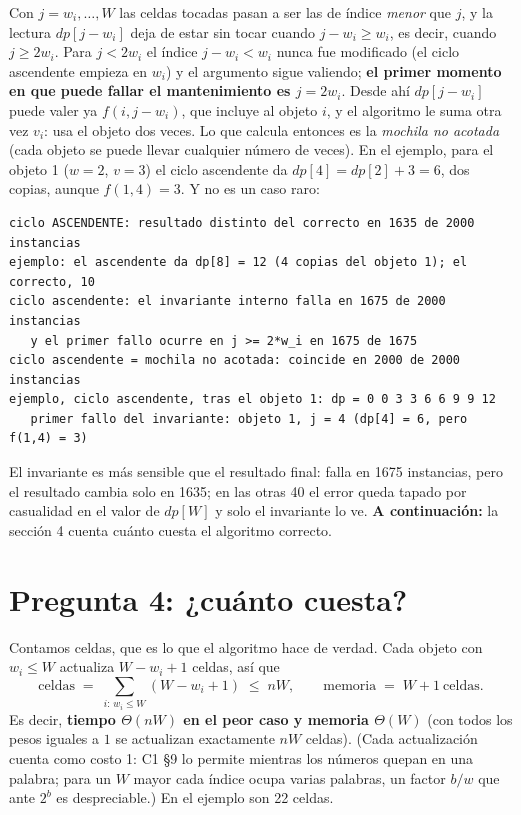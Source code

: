 \documentclass[11pt]{article}
\begin{document}
Con $j=w_i,\dots,W$ las celdas tocadas pasan a ser las de índice \emph{menor} que $j$, y la lectura
$dp[j-w_i]$ deja de estar sin tocar cuando $j-w_i\ge w_i$, es decir, cuando $j\ge2w_i$. Para $j<2w_i$ el
índice $j-w_i<w_i$ nunca fue modificado (el ciclo ascendente empieza en $w_i$) y el argumento sigue valiendo;
\textbf{el primer momento en que puede fallar el mantenimiento es $j=2w_i$}. Desde ahí $dp[j-w_i]$ puede valer
ya $f(i,j-w_i)$, que incluye al objeto $i$, y el algoritmo le suma otra vez $v_i$: usa el objeto dos veces. Lo
que calcula entonces es la \emph{mochila no acotada} (cada objeto se puede llevar cualquier número de veces).
En el ejemplo, para el objeto 1 ($w=2$, $v=3$) el ciclo ascendente da $dp[4]=dp[2]+3=6$, dos copias, aunque
$f(1,4)=3$. Y no es un caso raro:
\begin{lstlisting}[style=salida,basicstyle=\ttfamily\footnotesize\color{black},columns=fixed]
ciclo ASCENDENTE: resultado distinto del correcto en 1635 de 2000 instancias
ejemplo: el ascendente da dp[8] = 12 (4 copias del objeto 1); el correcto, 10
ciclo ascendente: el invariante interno falla en 1675 de 2000 instancias
   y el primer fallo ocurre en j >= 2*w_i en 1675 de 1675
ciclo ascendente = mochila no acotada: coincide en 2000 de 2000 instancias
ejemplo, ciclo ascendente, tras el objeto 1: dp = 0 0 3 3 6 6 9 9 12
   primer fallo del invariante: objeto 1, j = 4 (dp[4] = 6, pero f(1,4) = 3)
\end{lstlisting}
El invariante es más sensible que el resultado final: falla en 1675 instancias, pero el resultado cambia solo
en 1635; en las otras 40 el error queda tapado por casualidad en el valor de $dp[W]$ y solo el invariante lo ve.
\textbf{A continuación:} la sección 4 cuenta cuánto cuesta el algoritmo correcto.

\section{Pregunta 4: ¿cuánto cuesta?}

Contamos celdas, que es lo que el algoritmo hace de verdad. Cada objeto con $w_i\le W$ actualiza $W-w_i+1$
celdas, así que
\[
  \text{celdas}\;=\;\sum_{i:\,w_i\le W} (W-w_i+1)\;\le\; nW,
  \qquad
  \text{memoria}\;=\;W+1\ \text{celdas}.
\]
Es decir, \textbf{tiempo $\Theta(nW)$ en el peor caso y memoria $\Theta(W)$} (con todos los pesos iguales a $1$ se
actualizan exactamente $nW$ celdas). (Cada actualización cuenta como costo 1: C1 §9 lo
permite mientras los números quepan en una palabra; para un $W$ mayor cada índice ocupa varias palabras, un
factor $b/w$ que ante $2^b$ es despreciable.) En el ejemplo son 22 celdas.
\end{document}
